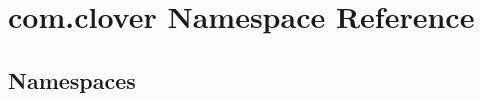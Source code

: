 \hypertarget{namespacecom_1_1clover}{}\section{com.\+clover Namespace Reference}
\label{namespacecom_1_1clover}
\subsection*{Namespaces}
\begin{DoxyCompactItemize}
\end{DoxyCompactItemize}
